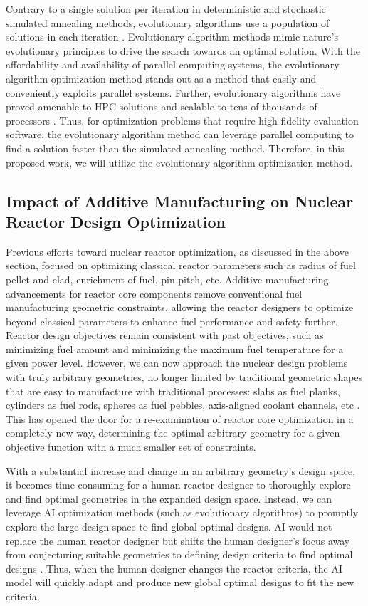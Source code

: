 Contrary to a single solution per iteration in deterministic and stochastic 
simulated annealing methods, evolutionary algorithms use a population of solutions in each 
iteration \cite{deb_multi-objective_2001}. 
Evolutionary algorithm methods mimic nature's evolutionary principles to drive 
the search towards an optimal solution. 
With the affordability and availability of parallel computing systems, the 
evolutionary algorithm optimization method stands out as a method 
that easily and conveniently exploits parallel systems. 
Further, evolutionary algorithms have proved amenable to \gls{HPC} solutions and 
scalable to tens of thousands of processors \cite{kropaczek_constraint_2019}. 
Thus, for optimization problems that require high-fidelity evaluation software, 
the evolutionary algorithm method can leverage parallel computing to find a 
solution faster than the simulated annealing method.
Therefore, in this proposed work, we will utilize the evolutionary algorithm 
optimization method. 

\subsection{Impact of Additive Manufacturing on Nuclear Reactor Design 
Optimization}
Previous efforts toward nuclear reactor optimization, as discussed in the above 
section, focused on optimizing classical reactor parameters such as 
radius of fuel pellet and clad, enrichment of fuel, pin pitch, etc. 
Additive manufacturing advancements for reactor core components remove
conventional fuel manufacturing geometric constraints, allowing the reactor 
designers to optimize beyond classical parameters to enhance fuel performance 
and safety further. 
Reactor design objectives remain consistent with past objectives, such as 
minimizing fuel amount and minimizing the maximum fuel temperature for a given 
power level.
However, we can now approach the nuclear design problems with truly arbitrary 
geometries, no longer limited by traditional geometric shapes that are 
easy to manufacture with traditional processes: slabs as fuel planks, cylinders 
as fuel rods, spheres as fuel pebbles, axis-aligned coolant channels, etc  
\cite{sobes_artificial_2020}.
This has opened the door for a re-examination of reactor core 
optimization in a completely new way, determining the optimal arbitrary geometry 
for a given objective function \cite{sobes_artificial_2020} with a much smaller 
set of constraints. 

With a substantial increase and change in an arbitrary geometry's design space, 
it becomes time consuming for a human reactor designer to thoroughly explore 
and find optimal geometries in the expanded design space. 
Instead, we can leverage \gls{AI} optimization methods (such as evolutionary algorithms) to 
promptly explore the large design space to find global optimal designs. 
\gls{AI} would not replace the human reactor designer but shifts the human 
designer's focus away from conjecturing suitable geometries to defining design 
criteria to find optimal designs \cite{sobes_artificial_2020}. 
Thus, when the human designer changes the reactor criteria, the \gls{AI} 
model will quickly adapt and produce new global optimal designs to fit the new 
criteria.  

